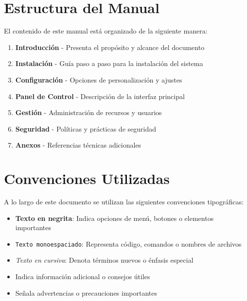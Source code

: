 \section{Estructura del Manual}

El contenido de este manual está organizado de la siguiente manera:

\begin{enumerate}
    \item \textbf{Introducción} - Presenta el propósito y alcance del documento
    \item \textbf{Instalación} - Guía paso a paso para la instalación del sistema
    \item \textbf{Configuración} - Opciones de personalización y ajustes
    \item \textbf{Panel de Control} - Descripción de la interfaz principal
    \item \textbf{Gestión} - Administración de recursos y usuarios
    \item \textbf{Seguridad} - Políticas y prácticas de seguridad
    \item \textbf{Anexos} - Referencias técnicas adicionales
\end{enumerate}

\section{Convenciones Utilizadas}

A lo largo de este documento se utilizan las siguientes convenciones tipográficas:

\begin{itemize}
    \item \textbf{Texto en negrita}: Indica opciones de menú, botones o elementos importantes
    \item \texttt{Texto monoespaciado}: Representa código, comandos o nombres de archivos
    \item \textit{Texto en cursiva}: Denota términos nuevos o énfasis especial
    \item {} Indica información adicional o consejos útiles
    \item {} Señala advertencias o precauciones importantes
\end{itemize}


